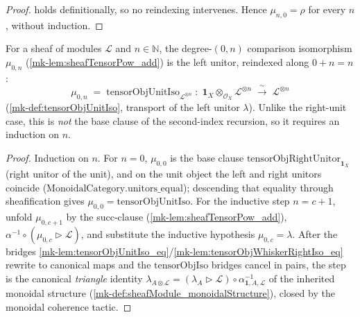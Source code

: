 \begin{proof}
  \leanok
  holds definitionally, so no reindexing intervenes. Hence \(\mu_{n,0} = \rho\) for
  every \(n\), without induction.
\end{proof}

\begin{lemma}\label{mk-lem:tensorPowAdd_zero_left}
  \leanok

  For a sheaf of modules \(\mathcal{L}\) and \(n \in \mathbb{N}\), the degree-\((0,n)\)
  comparison isomorphism \(\mu_{0,n}\) (\ref{mk-lem:sheafTensorPow_add}) is the left
  unitor, reindexed along \(0 + n = n\):
  \[
    \mu_{0,n} \;=\;
      \mathrm{tensorObjUnitIso}_{\mathcal{L}^{\otimes n}}
      \;:\; \mathbf{1}_X \otimes_{\mathcal{O}_X} \mathcal{L}^{\otimes n}
      \;\xrightarrow{\ \sim\ }\; \mathcal{L}^{\otimes n}
  \]
  (\ref{mk-def:tensorObjUnitIso}, transport of the left unitor \(\lambda\)). Unlike
  the right-unit case, this is \emph{not} the base clause of the second-index
  recursion, so it requires an induction on \(n\).
\end{lemma}

\begin{proof}
  \leanok
  Induction on \(n\). For \(n = 0\), \(\mu_{0,0}\) is the base clause
  \(\mathrm{tensorObjRightUnitor}_{\mathbf{1}_X}\) (right unitor of the unit), and on
  the unit object the left and right unitors coincide
  (\(\mathrm{MonoidalCategory.unitors\_equal}\)); descending that equality through
  sheafification gives \(\mu_{0,0} = \mathrm{tensorObjUnitIso}\). For the inductive
  step \(n = c+1\), unfold \(\mu_{0,c+1}\) by the succ-clause
  (\ref{mk-lem:sheafTensorPow_add}), \(\alpha^{-1} \circ (\mu_{0,c} \rhd \mathcal{L})\),
  and substitute the inductive hypothesis \(\mu_{0,c} = \lambda\). After the bridges
  \ref{mk-lem:tensorObjUnitIso_eq}/\ref{mk-lem:tensorObjWhiskerRightIso_eq} rewrite to
  canonical maps and the \(\mathrm{tensorObjIso}\) bridges cancel in pairs, the step
  is the canonical \emph{triangle} identity \(\lambda_{A \otimes \mathcal{L}} =
  (\lambda_A \rhd \mathcal{L}) \circ \alpha^{-1}_{\mathbf{1}, A, \mathcal{L}}\) of the
  inherited monoidal structure (\ref{mk-def:sheafModule_monoidalStructure}), closed by
  the \(\mathrm{monoidal}\) coherence tactic.
\end{proof}


